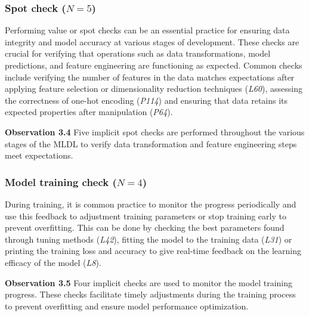 \documentclass[smallextended]{svjour3}       %
\newcommand{\highlight}[1]{\begin{framed}%
  \noindent#1
\end{framed}}
\providecommand{\DIFaddbegin}{} %
\providecommand{\DIFaddend}{} %
\providecommand{\DIFdelbegin}{} %
\providecommand{\DIFdelend}{} %
\newcommand{\DIFscaledelfig}{0.5}
\newlength{\DIFdelgraphicswidth} %
\newlength{\DIFdelgraphicsheight} %
\newcommand{\DIFaddincludegraphics}[2][]{{\color{blue}\fbox{\DIFOincludegraphics[#1]{#2}}}} %
\newcommand{\DIFdelincludegraphics}[2][]{%
\sbox{\DIFdelgraphicsbox}{\DIFOincludegraphics[#1]{#2}}%
\settoboxwidth{\DIFdelgraphicswidth}{\DIFdelgraphicsbox} %
\settoboxtotalheight{\DIFdelgraphicsheight}{\DIFdelgraphicsbox} %
\scalebox{\DIFscaledelfig}{%
\parbox[b]{\DIFdelgraphicswidth}{\usebox{\DIFdelgraphicsbox}\\[-\baselineskip] \rule{\DIFdelgraphicswidth}{0em}}\llap{\resizebox{\DIFdelgraphicswidth}{\DIFdelgraphicsheight}{%
\setlength{\unitlength}{\DIFdelgraphicswidth}%
\begin{picture}(1,1)%
\thicklines\linethickness{2pt} %
{\color[rgb]{1,0,0}\put(0,0){\framebox(1,1){}}}%
{\color[rgb]{1,0,0}\put(0,0){\line( 1,1){1}}}%
{\color[rgb]{1,0,0}\put(0,1){\line(1,-1){1}}}%
\end{picture}%
}\hspace*{3pt}}} %
} %
\DeclareRobustCommand{\DIFaddbegin}{\DIFOaddbegin \let\includegraphics\DIFaddincludegraphics} %
\DeclareRobustCommand{\DIFaddend}{\DIFOaddend \let\includegraphics\DIFOincludegraphics} %
\DeclareRobustCommand{\DIFdelbegin}{\DIFOdelbegin \let\includegraphics\DIFdelincludegraphics} %
\DeclareRobustCommand{\DIFdelend}{\DIFOaddend \let\includegraphics\DIFOincludegraphics} %
\begin{document}
\subsubsection{Spot check ($N = 5$)}

Performing value or spot checks can be an essential practice for ensuring data integrity and model accuracy at various stages of development. These checks are crucial for verifying that operations such as data transformations, model predictions, and feature engineering are functioning as expected. Common checks include verifying the number of features in the data matches expectations after applying feature selection or dimensionality reduction techniques (\emph{L60}), assessing the correctness of one-hot encoding (\emph{P114}) and ensuring that data retains its expected properties after manipulation (\emph{P64}).

\DIFdelbegin %
\DIFdelend \DIFaddbegin \highlight{\textbf{Observation 3.4} Five implicit spot checks are performed throughout the various stages of the MLDL to verify data transformation and feature engineering steps meet expectations.}
\DIFaddend 

\subsubsection{Model training check ($N = 4$)}

During training, it is common practice to monitor the progress periodically and use this feedback to adjustment training parameters or stop training early to prevent overfitting. This can be done by checking the best parameters found through tuning methods (\emph{L42}), fitting the model to the training data (\emph{L31}) or printing the training loss and accuracy to give real-time feedback on the learning efficacy of the model (\emph{L8}).

\DIFdelbegin %
\DIFdelend \DIFaddbegin \highlight{\textbf{Observation 3.5} Four implicit checks are used to monitor the model training progress. These checks facilitate timely adjustments during the training process to prevent overfitting and ensure model performance optimization.}
\DIFaddend 
\end{document}
